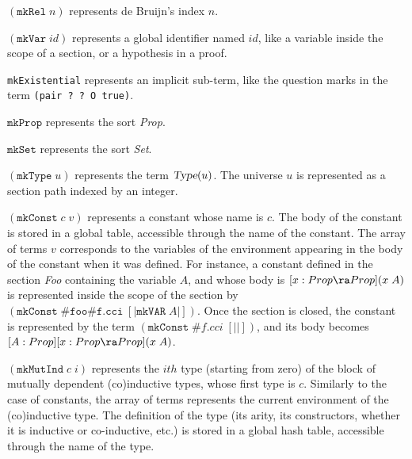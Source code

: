 \begin{description}
    {$(\texttt{mkRel}\;n)$ represents de Bruijn's index $n$.}

    {$(\texttt{mkVar}\;id)$
    represents a global identifier named $id$, like a variable
    inside the scope of a section, or a hypothesis in a proof}.

   {\texttt{mkExistential} represents an implicit sub-term, like the question
    marks in the term \texttt{(pair ? ? O true)}.}


    {$\texttt{mkProp}$ represents the sort \textsl{Prop}.}

    {$\texttt{mkSet}$ represents the sort \textsl{Set}.}

    {$(\texttt{mkType}\;u)$ represents the term
    $\textsl{Type}(u)$. The universe $u$ is represented as a 
    section path indexed by an integer. }

    {$(\texttt{mkConst}\;c\;v)$ represents a constant whose name is
    $c$. The body of the constant is stored in a global table,
    accessible through the name of the constant. The array of terms
    $v$ corresponds to the variables of the environment appearing in
    the body of the constant when it was defined. For instance, a
    constant defined in the section \textsl{Foo} containing the
    variable $A$, and whose body is $[x:Prop\ra Prop](x\;A)$ is
    represented inside the scope of the section by
    $(\texttt{mkConst}\;\texttt{\#foo\#f.cci}\;[| \texttt{mkVAR}\;A
    |])$.  Once the section is closed, the constant is represented by
    the term $(\texttt{mkConst}\;\#f.cci\;[| |])$, and its body
    becomes $[A:Prop][x:Prop\ra Prop](x\;A)$}.

    {$(\texttt{mkMutInd}\;c\;i)$ represents the $ith$ type
    (starting from zero) of the block of mutually dependent
    (co)inductive types, whose first type is $c$.  Similarly to the
    case of constants, the array of terms represents the current
    environment of the (co)inductive type. The definition of the type
    (its arity, its constructors, whether it is inductive or co-inductive, etc.)
    is stored in a global hash table, accessible through the name of 
    the type.}


\end{description}
